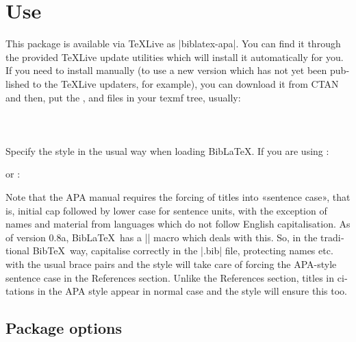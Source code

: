 \documentclass{ltxdockit}
\begin{document}
\section{Use}\label{ref:use}
\label{use}
This package is available via \TeX Live as |biblatex-apa|. You can find it
through the provided \TeX Live update utilities which will install it
automatically for you. If you need to install manually (to use a new
version which has not yet been published to the \TeX Live updaters, for
example), you can download it from CTAN and then, put the ,
 and  files in your texmf tree, usually:\\ 

\noindent{}\\
\\
\\

\noindent Specify the style in the usual way when loading Bib\LaTeX. If you
are using :

\begin{ltxcode}
\usepackage[american]{babel}
\usepackage{csquotes}
\usepackage[style=apa]{biblatex}
\end{ltxcode}

or :

\begin{ltxcode}
\usepackage{polyglossia}
\setdefaultlanguage[variant=american]{english}
\usepackage{csquotes}
\usepackage[style=apa]{biblatex}
\end{ltxcode}

\noindent Note that the APA manual requires the forcing of titles into
«sentence case», that is, initial cap followed by lower case for sentence
units, with the exception of names and material from languages which do not
follow English capitalisation. As of version 0.8a, Bib\LaTeX\ has a
|\MakeSentenceCase| macro which deals with this. So, in the traditional
Bib\TeX\ way, capitalise correctly in the |.bib| file, protecting names etc.
with the usual brace pairs and the style will take care of forcing the
APA-style sentence case in the References section. Unlike the References
section, titles in citations in the APA style appear in normal case and the
style will ensure this too.

\subsection{Package options}\label{opts}
\end{document}
